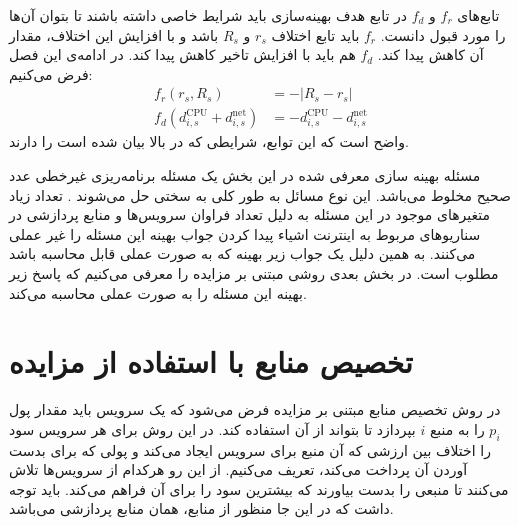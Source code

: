     تابع‌های $f_r$ و $f_d$ در تابع هدف بهینه‌سازی باید شرایط خاصی داشته باشند تا بتوان آن‌ها را مورد قبول دانست.
    $f_r$ باید تابع اختلاف $r_s$ و $R_s$ باشد و با افزایش این اختلاف، مقدار آن کاهش پیدا کند.
    $f_d$ هم باید با افزایش تاخیر‌ کاهش پیدا کند.
    در ادامه‌ی این فصل فرض می‌کنیم:
    \begin{align}
      f_r(r_s, R_s) & = -|R_s - r_s| \label{eqn:one_to_one:f_r}\\
      f_d(d^\text{CPU}_{i,s} + d^\text{net}_{i,s}) & = - d^\text{CPU}_{i,s} - d^\text{net}_{i,s}
    \end{align}
    واضح است که این توابع، شرایطی که در بالا بیان شده است را دارند.

    مسئله بهینه سازی معرفی شده در این بخش یک مسئله برنامه‌ریزی غیرخطی عدد صحیح مخلوط  می‌باشد.
    این نوع مسائل به طور کلی به سختی حل می‌شوند \cite{bertsimas1997introduction}.
    تعداد زیاد متغیر‌های موجود در این مسئله به دلیل تعداد فراوان سرویس‌ها و منابع پردازشی در سناریو‌های مربوط به اینترنت اشیاء پیدا کردن جواب بهینه این مسئله را غیر عملی می‌کنند.
    به همین دلیل یک جواب زیر بهینه که به صورت عملی قابل محاسبه باشد مطلوب است.
    در بخش بعدی روشی مبتنی بر مزایده را معرفی می‌کنیم که پاسخ زیر بهینه این مسئله را به صورت عملی محاسبه می‌کند.

  \section{تخصیص منابع با استفاده از مزایده}
    در روش‌ تخصیص منابع مبتنی بر مزایده فرض می‌شود که یک سرویس باید مقدار پول $p_i$ را به منبع $i$ بپردازد تا بتواند از آن استفاده کند.
    در این روش برای هر سرویس سود را اختلاف بین ارزشی که آن منبع برای سرویس ایجاد می‌کند و پولی که برای بدست آوردن آن پرداخت می‌کند، تعریف می‌کنیم.
    از این رو هرکدام از سرویس‌ها تلاش می‌کنند تا منبعی را بدست بیاورند که بیشترین سود را برای آن‌ فراهم می‌کند.
    باید توجه داشت که در این جا منظور از منابع، همان منابع پردازشی می‌باشد.
